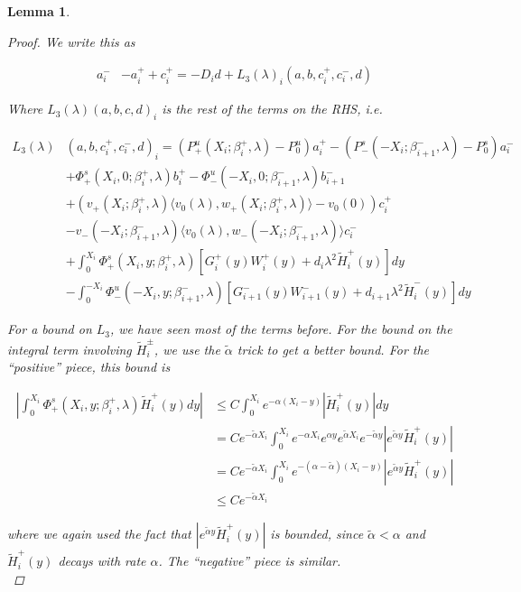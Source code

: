 \documentclass[12pt]{article}
\newtheorem{lemma}{Lemma}
\begin{document}
\begin{lemma}
\begin{proof}
We write this as

\begin{align*}
a_i^- &- a_i^+ + c_i^+ = -D_i d + L_3(\lambda)_i(a, b, c_i^+, c_i^-, d)
\end{align*}

Where $L_3(\lambda)(a, b, c, d)_i$ is the rest of the terms on the RHS, i.e. 

\begin{align*}
L_3(\lambda)&(a, b, c_i^+, c_i^-, d)_i = (P^u_+(X_i; \beta_i^+, \lambda) - P_0^u)a_i^+ - (P^s_-(-X_i; \beta_{i+1}^-,\lambda) - P_0^s)a_i^- \\
&+ \Phi^s_+(X_i, 0; \beta_i^+, \lambda)b_i^+ - \Phi^u_-(-X_i, 0; \beta_{i+1}^-, \lambda) b_{i+1}^- \\
&+ (v_+(X_i; \beta_i^+, \lambda) \langle v_0(\lambda), w_+(X_i; \beta_i^+, \lambda) \rangle - v_0(0) ) c_i^+ \\
&- v_-(-X_i; \beta_{i+1}^-, \lambda) \langle v_0(\lambda), w_-(-X_i; \beta_{i+1}^-, \lambda) \rangle c_i^- \\
&+ \int_0^{X_i} \Phi^s_+(X_i, y; \beta_i^+, \lambda) [ G_i^+(y) W_i^+(y) + d_i \lambda^2 \tilde{H}_i^+(y) ] dy \\
&- \int_0^{-X_i} \Phi^u_-(-X_i, y; \beta_{i+1}^-, \lambda) [ G_{i+1}^-(y) W_{i+1}^-(y) + d_{i+1} \lambda^2 \tilde{H}_i^-(y) ] dy
\end{align*}

For a bound on $L_3$, we have seen most of the terms before. For the bound on the integral term involving $\tilde{H}_i^\pm$, we use the $\tilde{\alpha}$ trick to get a better bound. For the ``positive'' piece, this bound is

\begin{align*}
\left| \int_0^{X_i} \Phi^s_+(X_i, y; \beta_i^+, \lambda) \tilde{H}_i^+(y) dy \right| 
&\leq C \int_0^{X_i} e^{-\alpha (X_i - y)}|\tilde{H}_i^+(y)| dy \\
&= C e^{-\tilde{\alpha}X_i} \int_0^{X_i} e^{-\alpha X_i} e^{\alpha y}  e^{\tilde{\alpha}X_i} e^{-\tilde{\alpha}y} |e^{\tilde{\alpha}y} \tilde{H}_i^+(y)| \\
&= C e^{-\tilde{\alpha}X_i} \int_0^{X_i} e^{-(\alpha - \tilde{\alpha})(X_i-y)} |e^{\tilde{\alpha}y} \tilde{H}_i^+(y)|\\
&\leq C e^{-\tilde{\alpha}X_i} 
\end{align*}

where we again used the fact that $|e^{\tilde{\alpha}y} \tilde{H}_i^+(y)|$ is bounded, since $\tilde{\alpha} < \alpha$ and $\tilde{H}_i^+(y)$ decays with rate $\alpha$. The ``negative'' piece is similar.\\


\end{proof}
\end{lemma}
\end{document}
